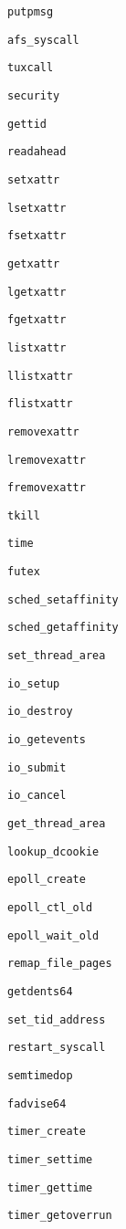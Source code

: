 \verb+putpmsg+

\verb+afs_syscall+

\verb+tuxcall+

\verb+security+

\verb+gettid+

\verb+readahead+

\verb+setxattr+

\verb+lsetxattr+

\verb+fsetxattr+

\verb+getxattr+

\verb+lgetxattr+

\verb+fgetxattr+

\verb+listxattr+

\verb+llistxattr+

\verb+flistxattr+

\verb+removexattr+

\verb+lremovexattr+

\verb+fremovexattr+

\verb+tkill+

\verb+time+

\verb+futex+

\verb+sched_setaffinity+

\verb+sched_getaffinity+

\verb+set_thread_area+

\verb+io_setup+

\verb+io_destroy+

\verb+io_getevents+

\verb+io_submit+

\verb+io_cancel+

\verb+get_thread_area+

\verb+lookup_dcookie+

\verb+epoll_create+

\verb+epoll_ctl_old+

\verb+epoll_wait_old+

\verb+remap_file_pages+

\verb+getdents64+

\verb+set_tid_address+

\verb+restart_syscall+

\verb+semtimedop+

\verb+fadvise64+

\verb+timer_create+

\verb+timer_settime+

\verb+timer_gettime+

\verb+timer_getoverrun+

